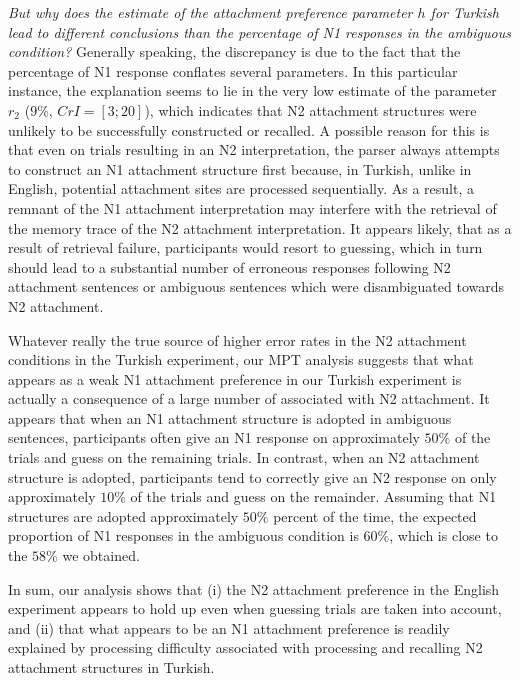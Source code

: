 \documentclass[11pt]{article}\usepackage[]{graphicx}\usepackage[]{color}
\begin{document}
\textit{But why does the estimate of the attachment preference parameter $h$ for Turkish lead to different conclusions than the percentage of N1 responses in the ambiguous condition?} 
Generally speaking, the discrepancy is due to the fact that the percentage of N1 response conflates several parameters. 
In this particular instance, the explanation seems to lie in the very low estimate of the parameter $r_2$ ($9\%$, $CrI=[3; 20]$), which indicates that N2 attachment structures were unlikely to be successfully constructed or recalled. A possible reason for this is that even on trials resulting in an N2 interpretation, the parser always attempts to construct an N1 attachment structure first because, in Turkish, unlike in English, potential attachment sites are processed sequentially. As a result, a remnant of the N1 attachment interpretation may interfere with the retrieval of the memory trace of the N2 attachment interpretation. 
It appears likely, that as a result of retrieval failure, participants would resort to guessing, which in turn should lead to a substantial number of erroneous responses following N2 attachment sentences or ambiguous sentences which were disambiguated towards N2 attachment.

Whatever really the true source of higher error rates in the N2 attachment conditions in the Turkish experiment, our MPT analysis suggests that what appears as a weak N1 attachment preference in our Turkish experiment is actually a consequence of a large number of  associated with N2 attachment. It appears that when an N1 attachment structure is adopted in ambiguous sentences, participants often give an N1 response on approximately $50\%$ of the trials and guess on the remaining trials. In contrast, when an N2 attachment structure is adopted, participants tend to correctly give an N2 response on only approximately $10\%$ of the trials and guess on the remainder. Assuming that N1 structures are adopted approximately $50\%$ percent of the time, the expected proportion of N1 responses in the ambiguous condition is $60\%$, which is close to the $58\%$ we obtained.

In sum, our analysis shows that (i) the N2 attachment preference in the English experiment appears to hold up even when guessing trials are taken into account, and (ii) that what appears to be an N1 attachment preference is readily explained by processing difficulty associated with processing and recalling N2 attachment structures in Turkish.
\end{document}

